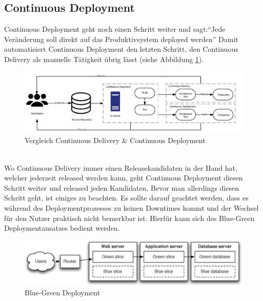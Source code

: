 \subsection{Continuous Deployment}
Continuous Deployment geht noch einen Schritt weiter und sagt:\enquote{Jede Veränderung soll direkt auf das Produktivsystem deployed werden}\autocite[Vgl.][S.17]{Stahl.2018} Damit automatisiert Continuous Deployment den letzten Schritt, den Continuous Delivery als manuelle Tätigkeit übrig lässt (siehe Abbildung \ref{img:cde2}).
\begin{figure}[h!]
	\centering
	\includegraphics[scale = 0.6]{img/CDE2.png}
	\caption{Vergleich Continuous Delivery \& Continuous Deployment}
	\label{img:cde2}
\end{figure}\\
 Wo Continuous Delivery immer einen Releasekandidaten in der Hand hat, welcher jederzeit released werden kann, geht Continuous Deployment diesen Schritt weiter und released jeden Kandidaten.\autocite[Vgl.][S.17]{Stahl.2018} Bevor man allerdings diesen Schritt geht, ist einiges zu beachten. Es sollte darauf geachtet werden, dass es während des Deploymentprozesses zu keinen Downtimes kommt und der Wechsel für den Nutzer praktisch nicht bemerkbar ist. Hierfür kann sich des Blue-Green Deploymentansatzes bedient werden.\autocite[Vgl.][S.407]{Farley.2010}
\begin{figure}[h!]
 	\centering
 	\includegraphics[scale = 1]{img/blue.jpg}
 	\caption{Blue-Green Deployment}
 	\label{img:blue}
\end{figure}
